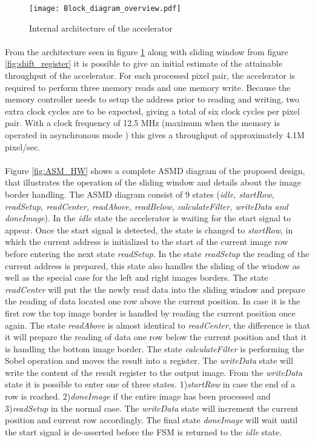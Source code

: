 \begin{figure}[H]
	\centering
	\texttt{[image: Block\_diagram\_overview.pdf]}
	\caption{Internal architecture of the accelerator}
	\label{fig:AccBlockDiagram}
\end{figure}

\paragraph*{}
From the architecture seen in figure \ref{fig:AccBlockDiagram} along with sliding window from figure \ref{fig:shift_register} it is possible to give an initial estimate of the attainable throughput of the accelerator. For each processed pixel pair, the accelerator is required to perform three memory reads and one memory write. Because the memory controller needs to setup the address prior to reading and writing, two extra clock cycles are to be expected, giving a total of six clock cycles per pixel pair.
With a clock frequency of 12.5 MHz (maximum when the memory is operated in asynchronous mode \cite{Micron:CellularRAM}) this gives a throughput of approximately 4.1M pixel/sec.

\paragraph*{}
Figure \ref{fig:ASM_HW} shows a complete ASMD diagram of the proposed design, that illustrates the operation of the sliding window and details about the image border handling. The ASMD diagram consist of 9 states (\emph{idle, startRow, readSetup, readCenter, readAbove, readBelow, calculateFilter, writeData and doneImage}).
In the \emph{idle} state the accelerator is waiting for the start signal to appear. Once the start signal is detected, the state is changed to \emph{startRow}, in which the current address is initialized to the start of the current image row before entering the next state \emph{readSetup}. In the state \emph{readSetup} the reading of the current address is prepared, this state also handles the sliding of the window as well as the special case for the left and right images borders. 
The state \emph{readCenter} will put the the newly read data into the sliding window and prepare the reading of data located one row above the current position. In case it is the first row the top image border is handled by reading the current position once again. The state \emph{readAbove} is almost identical to \emph{readCenter}, the difference is that it will prepare the reading of data one row below the current position and that it is handling the bottom image border.
The state \emph{calculateFilter} is performing the Sobel operation and moves the result into a register. The \emph{writeData} state will write the content of the result register to the output image. From the \emph{writeData} state it is possible to enter one of three states. 1)\emph{startRow} in case the end of a row is reached. 2)\emph{doneImage} if the entire image has been processed and 3)\emph{readSetup} in the normal case.
The \emph{writeData} state will increment the current position and current row accordingly. The final state \emph{doneImage} will wait until the start signal is de-asserted before the FSM is returned to the \emph{idle} state.

